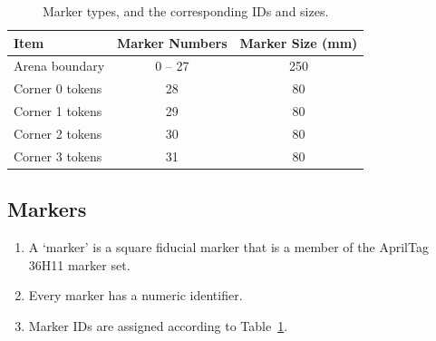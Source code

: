 \begin{table}[t]
      \centering
      \begin{tabular}{lcc}
            \toprule
            \textbf{Item} & \textbf{Marker Numbers} & \textbf{Marker Size (mm)} \\
            \midrule
            Arena boundary & {} 0 -- 27 & 250 \\
            Corner 0 tokens & 28 & 80 \\
            Corner 1 tokens & 29 & 80 \\
            Corner 2 tokens & 30 & 80 \\
            Corner 3 tokens & 31 & 80 \\
            \bottomrule
      \end{tabular}
      \caption{Marker types, and the corresponding IDs and sizes.}
      \label{tab:markers}
\end{table}

\subsection{Markers}
\label{spec:marker}

\begin{enumerate}
  \item A `marker' is a square fiducial marker that is a member of the AprilTag 36H11 marker set.
  \item Every marker has a numeric identifier.
  \item Marker IDs are assigned according to Table~\ref{tab:markers}.
\end{enumerate}
